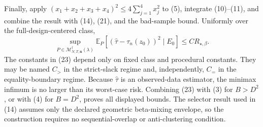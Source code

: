 Finally, apply \((x_1+x_2+x_3+x_4)^2\le4\sum_{j=1}^{4}x_j^2\) to (5), integrate (10)--(11), and combine the result with (14), (21), and the bad-sample bound.  Uniformly over the full-design-centered class,
\[
\sup_{P\in\mathcal M_{N,T,\mathbf n}^{\dagger}(\lambda)}
\mathbb E_P[(\widehat\tau-\tau_n(z_0))^2\mid E_0]
\le C R_{\star,\beta}.
\tag{23}
\]
The constants in (23) depend only on fixed class and procedural constants.  They may be named \(C_{>}\) in the strict-slack regime and, independently, \(C_{=}\) in the equality-boundary regime.  Because \(\widehat\tau\) is an observed-data estimator, the minimax infimum is no larger than its worst-case risk.  Combining (23) with (3) for \(B>D^2\), or with (4) for \(B=D^2\), proves all displayed bounds.  The selector result used in (14) assumes only the declared geometric beta-mixing envelope, so the construction requires no sequential-overlap or anti-clustering condition.
